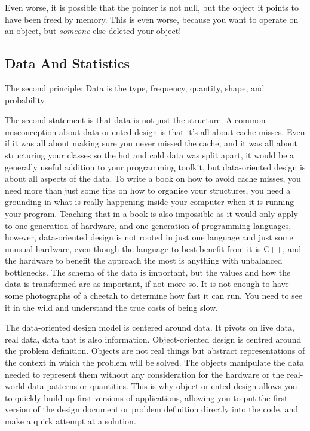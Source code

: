 \documentclass[a4paper,12pt]{article}
\begin{document}
Even worse, it is possible that the pointer is not null, but the object it points to have been freed by memory.
This is even worse, because you want to operate on an object, but \textit{someone} else deleted your object!

\subsection{Data And Statistics}

The second principle: Data is the type, frequency, quantity, shape, and probability.

The second statement is that data is not just the structure.
A common misconception about data-oriented design is that it's all about cache misses.
Even if it was all about making sure you never missed the cache, and it was all about structuring your classes so the hot and cold data was split apart, it would be a generally useful addition to your programming toolkit, but data-oriented design is about all aspects of the data.
To write a book on how to avoid cache misses, you need more than just some tips on how to organise your structures, you need a grounding in what is really happening inside your computer when it is running your program.
Teaching that in a book is also impossible as it would only apply to one generation of hardware, and one generation of programming languages, however, data-oriented design is not rooted in just one language and just some unusual hardware, even though the language to best benefit from it is C++, and the hardware to benefit the approach the most is anything with unbalanced bottlenecks.
The schema of the data is important, but the values and how the data is transformed are as important, if not more so.
It is not enough to have some photographs of a cheetah to determine how fast it can run.
You need to see it in the wild and understand the true costs of being slow.

The data-oriented design model is centered around data.
It pivots on live data, real data, data that is also information.
Object-oriented design is centred around the problem definition.
Objects are not real things but abstract representations of the context in which the problem will be solved.
The objects manipulate the data needed to represent them without any consideration for the hardware or the real-world data patterns or quantities.
This is why object-oriented design allows you to quickly build up first versions of applications, allowing you to put the first version of the design document or problem definition directly into the code, and make a quick attempt at a solution.
\end{document}
